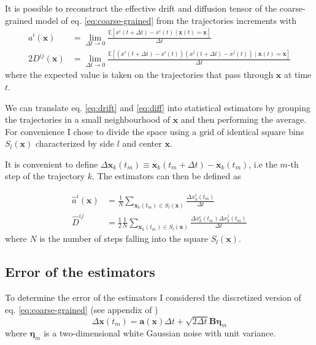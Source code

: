 \documentclass[a4paper]{article}
\begin{document}
It is possible to reconstruct the effective drift and diffusion tensor of the coarse-grained model of eq. \ref{eq:coarse-grained} from the trajectories increments \cite{hoze2014} \cite{schuss} with
\begin{align}
a^i(\bm{x}) &= \lim_{\Delta t \to 0}\frac{\mathbb{E}\left[x^i(t + \Delta t) - x^i(t) \mid \bm{x}(t) = \bm{x}\right]}{\Delta t} \label{eq:drift}\\[10pt]
2D^{ij}(\bm{x}) &= \lim_{\Delta t \to 0}\frac{\mathbb{E}\left[\left(x^i(t + \Delta t) - x^i(t)\right)\left(x^j(t + \Delta t) - x^j(t)\right) \mid \bm{x}(t) = \bm{x}\right]}{\Delta t} \label{eq:diff}
\end{align}
where the expected value is taken on the trajectories that pass through $\bm{x}$ at time $t$.

We can translate eq. \ref{eq:drift} and \ref{eq:diff} into statistical estimators by grouping the trajectories in a small neighbourhood of $\bm{x}$ and then performing the average. For convenience I chose to divide the space using a grid of identical square bins $S_l(\bm{x})$ characterized by side $l$ and center $\bm{x}$.

It is convenient to define $\Delta \bm{x}_k(t_m) \equiv \bm{x}_k(t_m + \Delta t) - \bm{x}_k(t_m)$, i.e the $m$-th step of the trajectory $k$. The estimators can then be defined as

\begin{align}
\hat{a}^i({\bm{x}}) &= \frac{1}{N} \sum_{\bm{x}_k(t_m) \in S_l(\bm{x})} \frac{\Delta x_k^i(t_m)}{\Delta t} \label{eq:drift-estimator} \\[10pt]
\hat{D}^{ij} &= \frac{1}{2} \frac{1}{N} \sum_{\bm{x}_k(t_m) \in S_l(\bm{x})}\frac{\Delta x_k^i(t_m) \Delta x_k^j(t_m)}{\Delta t} \label{eq:diff-estimator}
\end{align}
where $N$ is the number of steps falling into the square $S_l(\bm{x})$.

\subsection{Error of the estimators}

To determine the error of the estimators I considered the discretized version of eq. \ref{eq:coarse-grained} (see appendix of \cite{hoze2012})
\begin{equation}
\Delta \bm{x}(t_m) = \bm{a}(\bm{x}) \Delta t + \sqrt{2 \Delta t} \bm{B} \bm{\eta}_m
\end{equation}
where $\bm{\eta}_m$ is a two-dimensional white Gaussian noise with unit variance.
\end{document}
